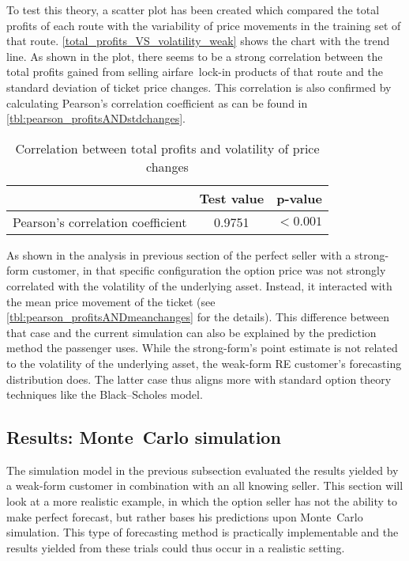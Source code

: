 To test this theory, a scatter plot has been created which compared the total profits of each route with the variability of price movements in the training set of that route. \autoref{total_profits_VS_volatility_weak} shows the chart with the trend line. As shown in the plot, there seems to be a strong correlation between the total profits gained from selling airfare~lock-in products of that route and the standard deviation of ticket price changes. This correlation is also confirmed by calculating Pearson's correlation coefficient as can be found in \autoref{tbl:pearson_profitsANDstdchanges}.


\begin{table}
\centering
\begin{tabular}{l c c}
\toprule
~  &  Test value  &  p-value  \\
\midrule
Pearson's correlation coefficient   &  0.9751  &  $< 0.001$ \\
\bottomrule
\end{tabular}
\caption{Correlation between total profits and volatility of price changes}
\label{tbl:pearson_profitsANDstdchanges}
\end{table}




As shown in the analysis in previous section of the perfect seller with a strong-form customer, in that specific configuration the option price was not strongly correlated with the volatility of the underlying asset. Instead, it interacted with the mean price movement of the ticket (see \autoref{tbl:pearson_profitsANDmeanchanges} for the details). This difference between that case and the current simulation can also be explained by the prediction method the passenger uses. While the strong-form's point estimate is not related to the volatility of the underlying asset, the weak-form RE customer's forecasting distribution does. The latter case thus aligns more with standard option theory techniques like the Black--Scholes model.

\subsection{Results: Monte~Carlo simulation}
The simulation model in the previous subsection evaluated the results yielded by a weak-form customer in combination with an all knowing seller. This section will look at a more realistic example, in which the option seller has not the ability to make perfect forecast, but rather bases his predictions upon Monte~Carlo simulation. This type of forecasting method is practically implementable and the results yielded from these trials could thus occur in a realistic setting.

